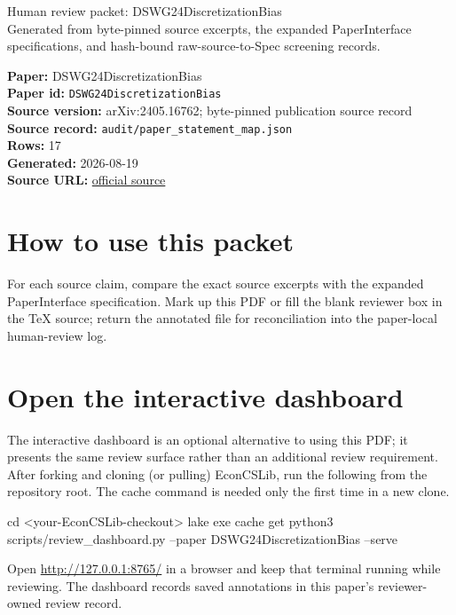 \documentclass[10pt]{article}
\begin{document}
\fontsize{9}{10}\selectfont

\begin{center}
{\LARGE Human review packet: DSWG24DiscretizationBias}\\[0.35em]
\small Generated from byte-pinned source excerpts, the expanded PaperInterface
specifications, and hash-bound raw-source-to-Spec screening records.
\end{center}

\noindent\textbf{Paper:} DSWG24DiscretizationBias\\
\textbf{Paper id:} \texttt{DSWG24DiscretizationBias}\\
\textbf{Source version:} arXiv:2405.16762; byte-pinned publication source record\\
\textbf{Source record:} \texttt{audit/paper\_statement\_map.json}\\
\textbf{Rows:} 17\\
\textbf{Generated:} 2026-08-19\\
\textbf{Source URL:} \href{https://arxiv.org/pdf/2405.16762}{official source}

\noindent{}\par



\section*{How to use this packet}
For each source claim, compare the exact source excerpts with the expanded
PaperInterface specification. Mark up this PDF or fill the blank reviewer box in the TeX source;
return the annotated file for reconciliation into the paper-local human-review
log.

\section*{Open the interactive dashboard}
The interactive dashboard is an optional alternative to using this PDF; it
presents the same review surface rather than an additional review requirement.
After forking and cloning (or pulling) EconCSLib, run the following from the
repository root. The cache command is needed only the first time in a new clone.
\begin{ReviewVerbatim}
cd <your-EconCSLib-checkout>
lake exe cache get
python3 scripts/review_dashboard.py --paper DSWG24DiscretizationBias --serve
\end{ReviewVerbatim}
Open \url{http://127.0.0.1:8765/} in a browser and keep that terminal running
while reviewing. The dashboard records saved annotations in this paper's
reviewer-owned review record.
\end{document}

